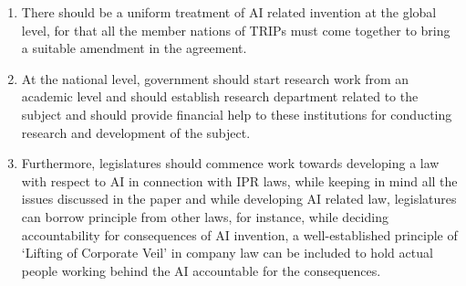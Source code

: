 \begin{multicols}{2}
\renewcommand{\theenumi}{\alph{enumi}}
\begin{enumerate}[label=\alph*.]
\item There should be a uniform treatment of AI related invention at the global level, for
that all the member nations of TRIPs must come together to bring a suitable
amendment in the agreement. 

\item At the national level, government should start research work from an academic level
and should establish research department related to the subject and should provide
financial help to these institutions for conducting research and development of the
subject.

\item Furthermore, legislatures should commence work towards developing a law with
respect to AI in connection with IPR laws, while keeping in mind all the issues
discussed in the paper and while developing AI related law, legislatures can borrow
principle from other laws, for instance, while deciding accountability for
consequences of AI invention, a well-established principle of ‘Lifting of Corporate Veil’ in company law can be included to hold actual people working behind the AI
accountable for the consequences. 
\end{enumerate}

\end{multicols}
